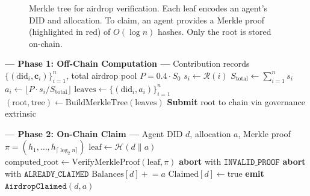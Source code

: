 \documentclass[conference]{IEEEtran}
\begin{document}
\begin{figure}[t]
{}%
\caption{Merkle tree for airdrop verification. Each leaf encodes an agent's DID and allocation. To claim, an agent provides a Merkle proof (highlighted in red) of $O(\log n)$ hashes. Only the root is stored on-chain.}
\label{fig:merkle}
\end{figure}

\begin{algorithm}[t]
\caption{Airdrop Computation and Claim}
\label{alg:airdrop}
\begin{algorithmic}[1]
\STATE \textbf{--- Phase 1: Off-Chain Computation ---}
\REQUIRE Contribution records $\{(\text{did}_i, \mathbf{c}_i)\}_{i=1}^{n}$, total airdrop pool $P = 0.4 \cdot S_0$
    \STATE $s_i \leftarrow \mathcal{R}(i)$ 
\ENDFOR
\STATE $S_{\text{total}} \leftarrow \sum_{i=1}^{n} s_i$
    \STATE $a_i \leftarrow \lfloor P \cdot s_i / S_{\text{total}} \rfloor$ 
\ENDFOR
\STATE $\text{leaves} \leftarrow \{(\text{did}_i, a_i)\}_{i=1}^{n}$
\STATE $(\text{root}, \text{tree}) \leftarrow \text{BuildMerkleTree}(\text{leaves})$
\STATE \textbf{Submit} $\text{root}$ to chain via governance extrinsic

\STATE
\STATE \textbf{--- Phase 2: On-Chain Claim ---}
\REQUIRE Agent DID $d$, allocation $a$, Merkle proof $\pi = (h_1, \ldots, h_{\lceil \log_2 n \rceil})$
\STATE $\text{leaf} \leftarrow \mathcal{H}(d \| a)$
\STATE $\text{computed\_root} \leftarrow \text{VerifyMerkleProof}(\text{leaf}, \pi)$
    \STATE \textbf{abort} with $\texttt{INVALID\_PROOF}$
\ENDIF
{}
    \STATE \textbf{abort} with $\texttt{ALREADY\_CLAIMED}$
\ENDIF
\STATE $\text{Balances}[d] \mathrel{+}= a$
\STATE $\text{Claimed}[d] \leftarrow \text{true}$
\STATE \textbf{emit} $\texttt{AirdropClaimed}(d, a)$
\end{algorithmic}
\end{algorithm}
\end{document}
